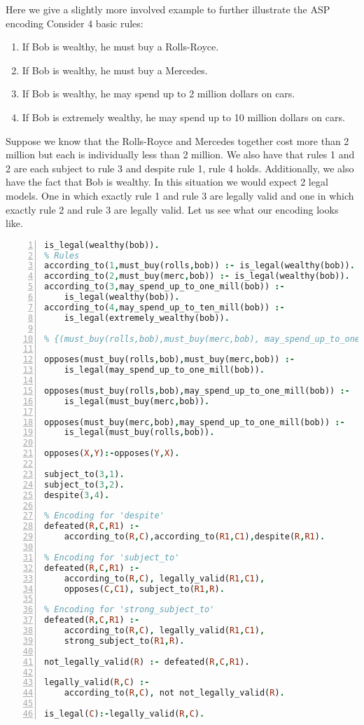 Here we give a slightly more involved example to further illustrate the ASP encoding
Consider 4 basic rules:
\begin{enumerate}
  \item If Bob is wealthy, he must buy a Rolls-Royce.
  \item If Bob is wealthy, he must buy a Mercedes.
  \item If Bob is wealthy, he may spend up to 2 million dollars on cars.
  \item If Bob is extremely wealthy, he may spend up to 10 million dollars on cars.
\end{enumerate}
Suppose we know that the Rolls-Royce and Mercedes together cost more
than 2 million but each is individually less than 2 million. We also
have that rules 1 and 2 are each subject to rule 3 and despite rule 1,
rule 4 holds. Additionally, we also have the fact that Bob is
wealthy. In this situation we would expect 2 legal models. One in which
exactly rule 1 and rule 3 are legally valid and one in which exactly
rule 2 and rule 3 are legally valid. Let us see what our encoding
looks like.
\begin{lstlisting}[language=Prolog, numbers=left]
is_legal(wealthy(bob)).
% Rules
according_to(1,must_buy(rolls,bob)) :- is_legal(wealthy(bob)).
according_to(2,must_buy(merc,bob)) :- is_legal(wealthy(bob)).
according_to(3,may_spend_up_to_one_mill(bob)) :-
    is_legal(wealthy(bob)).
according_to(4,may_spend_up_to_ten_mill(bob)) :-
    is_legal(extremely_wealthy(bob)).

% {(must_buy(rolls,bob),must_buy(merc,bob), may_spend_up_to_one_mill(bob)} is a min. inconsistent set.

opposes(must_buy(rolls,bob),must_buy(merc,bob)) :-
    is_legal(may_spend_up_to_one_mill(bob)).

opposes(must_buy(rolls,bob),may_spend_up_to_one_mill(bob)) :-
    is_legal(must_buy(merc,bob)).

opposes(must_buy(merc,bob),may_spend_up_to_one_mill(bob)) :-
    is_legal(must_buy(rolls,bob)).

opposes(X,Y):-opposes(Y,X).

subject_to(3,1).
subject_to(3,2).
despite(3,4).

% Encoding for 'despite'
defeated(R,C,R1) :-
    according_to(R,C),according_to(R1,C1),despite(R,R1).

% Encoding for 'subject_to'
defeated(R,C,R1) :-
    according_to(R,C), legally_valid(R1,C1),
    opposes(C,C1), subject_to(R1,R).

% Encoding for 'strong_subject_to'
defeated(R,C,R1) :-
    according_to(R,C), legally_valid(R1,C1),
    strong_subject_to(R1,R).

not_legally_valid(R) :- defeated(R,C,R1).

legally_valid(R,C) :- 
    according_to(R,C), not not_legally_valid(R).

is_legal(C):-legally_valid(R,C).
\end{lstlisting}
